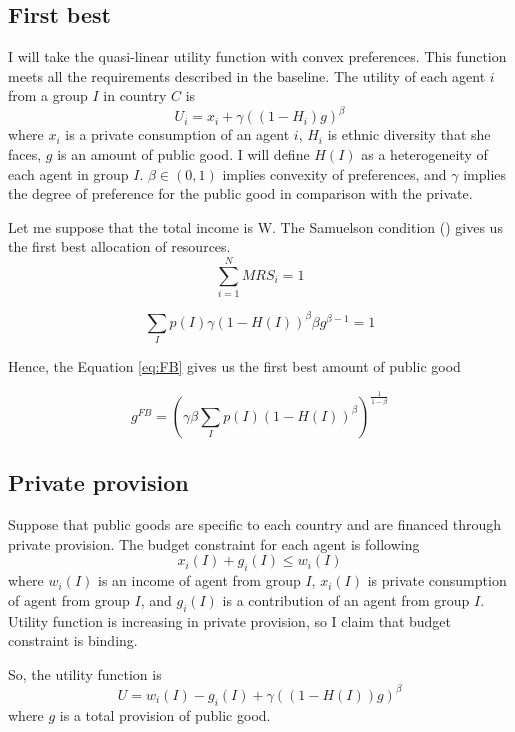 \documentclass[12pt]{article}
\begin{document}
\subsection{First best}

I will take the quasi-linear utility function with convex preferences. This function meets all the requirements described in the baseline. The utility of each agent $i$ from a group $I$ in country $C$ is 
\begin{equation}
\label{eq:utility}
U_i = x_i + \gamma((1 - H_i) g)^\beta    
\end{equation}
where $x_i$ is a private consumption of an agent $i$, $H_i$ is ethnic diversity that she faces, $g$ is an amount of public good. I will define $H(I)$ as a heterogeneity of each agent in group $I$. $\beta \in (0,1) $ implies convexity of preferences, and $\gamma$ implies the degree of preference for the public good in comparison with the private.

Let me suppose that the total income is W. The Samuelson condition (\cite{Samuelson}) gives us the first best allocation of resources.
\begin{equation}
    \label{eq:SC}
    \sum_{i = 1}^{N} MRS_i = 1
\end{equation}

\[ \sum_{I} p(I) \gamma(1-H(I))^\beta \beta g^{\beta - 1} = 1 \]

Hence, the Equation \ref{eq:FB} gives us the first best amount of public good

\begin{equation}
   g^{FB} = \left( \gamma\beta \sum_{I} p(I) (1-H(I))^{\beta} \right) ^\frac{1}{1 - \beta } 
   \label{eq:FB}
\end{equation}

\subsection{Private provision}

Suppose that public goods are specific to each country and are financed through private provision. 
The budget constraint for each agent is following
\[x_i(I) + g_i(I) \le  w_i(I) \]
where $w_i(I)$ is an income of agent from group $I$, $x_i(I)$ is private consumption of agent from group $I$,  and $g_i(I)$ is a contribution of an agent from group $I$. Utility function is increasing in private provision, so I claim that budget constraint is binding.

So, the utility function is
\[ U = w_i(I) - g_i(I) + \gamma( (1 - H(I) ) g)^\beta \] 
where $g$ is a total provision of public good.
\end{document}
